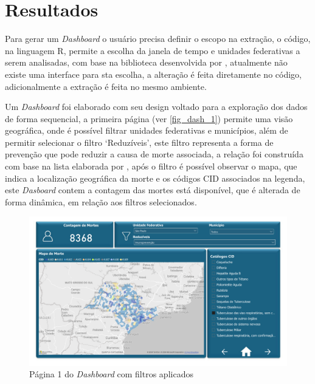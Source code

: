 \chapter{Resultados}

Para gerar um \textit{Dashboard} o usuário precisa definir o escopo na extração, o código, na linguagem R, permite a escolha da janela de tempo e unidades federativas a serem analisadas, com base na biblioteca desenvolvida por , atualmente não existe uma interface para sta escolha, a alteração é feita diretamente no código, adicionalmente a extração é feita no mesmo ambiente.

Um \textit{Dashboard} foi elaborado com seu design voltado para a exploração dos dados de forma sequencial, a primeira página (ver \autoref{fig_dash_1}) permite uma visão geográfica, onde é possível filtrar unidades federativas e municípios, além de permitir selecionar o filtro `Reduzíveis', este filtro representa a forma de prevenção que pode reduzir a causa de morte associada, a relação foi construída com base na lista elaborada por , após o filtro é possível observar o mapa, que indica a localização geográfica da morte e os códigos CID associados na legenda, este \textit{Dasboard} contem a contagem das mortes está disponível, que é alterada de forma dinâmica, em relação aos filtros selecionados.

\begin{figure}[H]
	\caption{\label{fig_dash_1}Página 1 do \textit{Dashboard} com filtros aplicados}
	\begin{center}
		\includegraphics[width=\textwidth, page = 1]{USPSC-img/dash}
	\end{center}
\end{figure}

